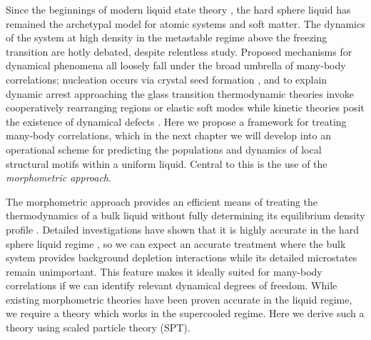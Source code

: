 \documentclass[11pt,twoside]{report}
\begin{document}
Since the beginnings of modern liquid state theory \cite{KirkwoodJCP1935}, the hard sphere liquid has remained the archetypal model for atomic systems and soft matter.
The dynamics of the system at high density in the metastable regime above the freezing transition are hotly debated, despite relentless study.
Proposed mechanisms for dynamical phenomena all loosely fall under the broad umbrella of many-body correlations; nucleation occurs via crystal seed formation \cite{SearJPCM2007}, and to explain dynamic arrest approaching the glass transition thermodynamic theories invoke cooperatively rearranging regions \cite{LubchenkoARPC2007} or elastic soft modes \cite{BritoJCP2009} while kinetic theories posit the existence of dynamical defects \cite{ChandlerARPC2010}.
Here we propose a framework for treating many-body correlations, which in the next chapter we will develop into an operational scheme for predicting the populations and dynamics of local structural motifs within a uniform liquid.
Central to this is the use of the \emph{morphometric approach}.

The morphometric approach provides an efficient means of treating the thermodynamics of a bulk liquid without fully determining its equilibrium density profile \cite{KonigPRL2004,RothPRL2006,Hansen-GoosPRL2007,RobinsonPRL2019}.
Detailed investigations have shown that it is highly accurate in the hard sphere liquid regime \cite{OettelEL2009,AshtonPRE2011,LairdPRE2012,BlokhuisPRE2013,UrrutiaPRE2014,Hansen-GoosJCP2014}, so we can expect an accurate treatment where the bulk system provides background depletion interactions while its detailed microstates remain unimportant.
This feature makes it ideally suited for many-body correlations if we can identify relevant dynamical degrees of freedom.
While existing morphometric theories have been proven accurate in the liquid regime, we require a theory which works in the supercooled regime.
Here we derive such a theory using scaled particle theory (SPT).
\end{document}
